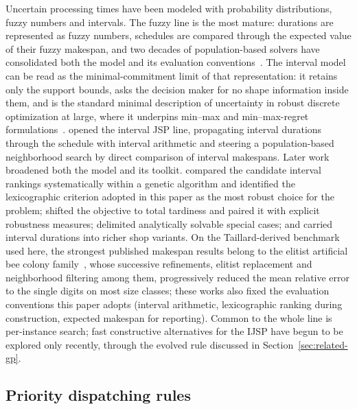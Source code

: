 \documentclass[preprint,authoryear,12pt]{elsarticle}
\theoremstyle{definition}
\theoremstyle{remark}
\begin{document}
Uncertain processing times have been modeled with probability
distributions, fuzzy numbers and intervals. The fuzzy line is the most
mature: durations are represented as fuzzy numbers, schedules are
compared through the expected value of their fuzzy makespan, and two
decades of population-based solvers have consolidated both the model
and its evaluation
conventions~\citep{GonzalezRodriguez2010,Abdullah2014,Palacios2015}.
The interval model can be read as the minimal-commitment limit of
that representation: it retains only the support bounds, asks the
decision maker for no shape information inside them, and is the
standard minimal description of uncertainty in robust discrete
optimization at large, where it underpins min--max and
min--max-regret formulations~\citep{Kouvelis1997,Kasperski2016}.
\citet{Lei2011} opened the interval JSP line, propagating interval
durations through the schedule with interval arithmetic and steering
a population-based neighborhood search by direct comparison of
interval makespans. Later work broadened both the model and its
toolkit. \citet{DiazGA2020} compared the candidate interval rankings
systematically within a genetic algorithm and identified the
lexicographic criterion adopted in this paper as the most robust
choice for the problem; \citet{DiazTardiness2022} shifted the
objective to total tardiness and paired it with explicit robustness
measures; \citet{Sotskov2020} delimited analytically solvable special
cases; and \citet{Zheng2024} carried interval durations into richer
shop variants. On the Taillard-derived benchmark used here, the
strongest published makespan results belong to the elitist artificial
bee colony family~\citep{DiazICAE2023,DiazFEABC2023}, whose
successive refinements, elitist replacement and neighborhood
filtering among them, progressively reduced the mean relative error
to the single digits on most size classes; these works also
fixed the evaluation conventions this paper adopts (interval
arithmetic, lexicographic ranking during construction, expected
makespan for reporting). Common to the whole line is per-instance
search; fast constructive alternatives for the IJSP have begun to be
explored only recently, through the evolved rule discussed in
Section~\ref{sec:related-gp}.

\subsection{Priority dispatching rules}
\label{sec:related-rules}
\end{document}
